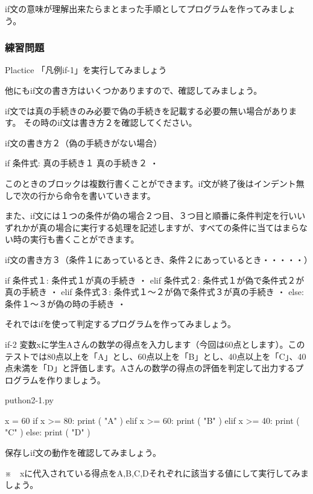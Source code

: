 \documentclass[11pt,a4paper,dvipdfmx,titlepage]{jsreport}
\begin{document}
if文の意味が理解出来たらまとまった手順としてプログラムを作ってみましょう。

\subsubsection{練習問題}
\begin{plabox}{Plactice}
「凡例if-1」を実行してみましょう
\end{plabox}

他にもif文の書き方はいくつかありますので、確認してみましょう。

if文では真の手続きのみ必要で偽の手続きを記載する必要の無い場合があります。
その時のif文は書き方２を確認してください。
\newpage
\begin{grabox}{if文の書き方２（偽の手続きがない場合）}
\begin{listing}{1}
if 条件式:
    真の手続き１
    真の手続き２
    ・
\end{listing}
\end{grabox}
このときのブロックは複数行書くことができます。if文が終了後はインデント無しで次の行から命令を書いていきます。

また、if文には１つの条件が偽の場合２つ目、３つ目と順番に条件判定を行いいずれかが真の場合に実行する処理を記述しますが、すべての条件に当てはまらない時の実行も書くことができます。

\begin{grabox}{if文の書き方３（条件１にあっているとき、条件２にあっているとき・・・・・）}
\begin{listing}{1}
if 条件式１:
    条件式１が真の手続き
    ・
elif 条件式２:
    条件式１が偽で条件式２が真の手続き
    ・
elif 条件式３:
    条件式１～２が偽で条件式３が真の手続き
    ・
else:
    条件１～３が偽の時の手続き
    ・
\end{listing}
\end{grabox}
\newpage
それではifを使って判定するプログラムを作ってみましょう。
\begin{pabox}{if-2}
変数xに学生Aさんの数学の得点を入力します（今回は60点とします）。このテストでは80点以上を「A」とし、60点以上を「B」とし、40点以上を「C」、40点未満を「D」と評価します。Aさんの数学の得点の評価を判定して出力するプログラムを作りましょう。
\begin{legbox}{puthon2-1.py}
\begin{listing}{1}
x = 60
if x >= 80:
    print ( "A" )
elif x >= 60:
    print ( "B" )
elif x >= 40:
    print ( "C" )
else:
    print ( "D" )
\end{listing}
\end{legbox}
保存しif文の動作を確認してみましょう。

※　xに代入されている得点をA,B,C,Dそれぞれに該当する値にして実行してみましょう。
\end{pabox}
\end{document}
